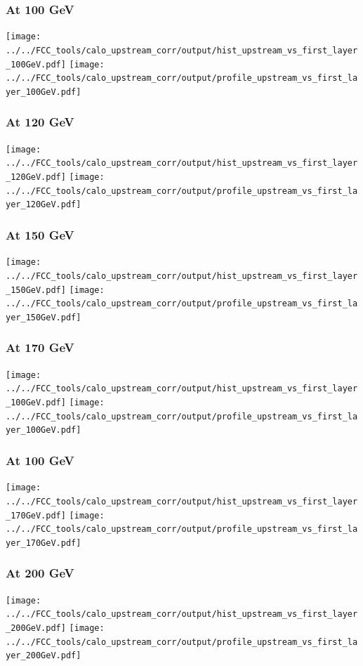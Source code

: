 \documentclass{beamer}
\begin{document}
\begin{frame}
  \frametitle{At 100 GeV}

  \texttt{[image: ../../FCC\_tools/calo\_upstream\_corr/output/hist\_upstream\_vs\_first\_layer\_100GeV.pdf]}
  \texttt{[image: ../../FCC\_tools/calo\_upstream\_corr/output/profile\_upstream\_vs\_first\_layer\_100GeV.pdf]}
\end{frame}

\begin{frame}
  \frametitle{At 120 GeV}

  \texttt{[image: ../../FCC\_tools/calo\_upstream\_corr/output/hist\_upstream\_vs\_first\_layer\_120GeV.pdf]}
  \texttt{[image: ../../FCC\_tools/calo\_upstream\_corr/output/profile\_upstream\_vs\_first\_layer\_120GeV.pdf]}
\end{frame}

\begin{frame}
  \frametitle{At 150 GeV}

  \texttt{[image: ../../FCC\_tools/calo\_upstream\_corr/output/hist\_upstream\_vs\_first\_layer\_150GeV.pdf]}
  \texttt{[image: ../../FCC\_tools/calo\_upstream\_corr/output/profile\_upstream\_vs\_first\_layer\_150GeV.pdf]}
\end{frame}

\begin{frame}
  \frametitle{At 170 GeV}

  \texttt{[image: ../../FCC\_tools/calo\_upstream\_corr/output/hist\_upstream\_vs\_first\_layer\_100GeV.pdf]}
  \texttt{[image: ../../FCC\_tools/calo\_upstream\_corr/output/profile\_upstream\_vs\_first\_layer\_100GeV.pdf]}
\end{frame}

\begin{frame}
  \frametitle{At 100 GeV}

  \texttt{[image: ../../FCC\_tools/calo\_upstream\_corr/output/hist\_upstream\_vs\_first\_layer\_170GeV.pdf]}
  \texttt{[image: ../../FCC\_tools/calo\_upstream\_corr/output/profile\_upstream\_vs\_first\_layer\_170GeV.pdf]}
\end{frame}

\begin{frame}
  \frametitle{At 200 GeV}

  \texttt{[image: ../../FCC\_tools/calo\_upstream\_corr/output/hist\_upstream\_vs\_first\_layer\_200GeV.pdf]}
  \texttt{[image: ../../FCC\_tools/calo\_upstream\_corr/output/profile\_upstream\_vs\_first\_layer\_200GeV.pdf]}
\end{frame}
\end{document}
